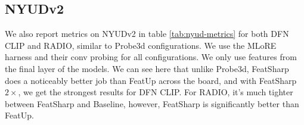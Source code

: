 \subsection{NYUDv2}

We also report metrics on NYUDv2 \cite{silberman2012nyud} in table \ref{tab:nyud-metrics} for both DFN CLIP and RADIO, similar to Probe3d configurations. We use the MLoRE~\cite{jiang2024mlore} harness and their conv probing for all configurations. We only use features from the final layer of the models. We can see here that unlike Probe3d, FeatSharp does a noticeably better job than FeatUp across the board, and with FeatSharp $2\times$, we get the strongest results for DFN CLIP. For RADIO, it's much tighter between FeatSharp and Baseline, however, FeatSharp is significantly better than FeatUp.

\begin{table}[]
    \centering
    \caption{Multitask metrics on NYUDv2 \cite{silberman2012nyud} using the MLoRE \cite{jiang2024mlore} convolutional probe harness.}
    \label{tab:nyud-metrics}
\end{table}

